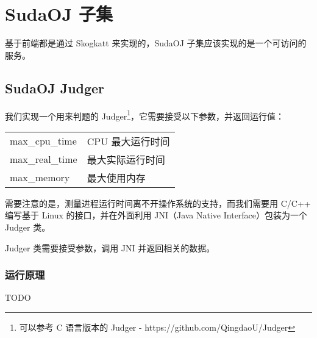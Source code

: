 
\section{SudaOJ 子集}
基于前端都是通过 Skogkatt 来实现的，SudaOJ 子集应该实现的是一个可访问的服务。

\subsection{SudaOJ Judger}
我们实现一个用来判题的 Judger\footnote{可以参考 C 语言版本的 Judger - %
https://github.com/QingdaoU/Judger}，它需要接受以下参数，并返回运行值：

\begin{center}
\begin{tabular}{ll}
    \hline
    max\_cpu\_time      & CPU 最大运行时间  \\
    max\_real\_time     & 最大实际运行时间  \\
    max\_memory         & 最大使用内存      \\
    \hline
\end{tabular}
\end{center}

需要注意的是，测量进程运行时间离不开操作系统的支持，而我们需要用 C/C++ 编写基于
Linux 的接口，并在外面利用 JNI（Java Native Interface）包装为一个 Judger 类。

Judger 类需要接受参数，调用 JNI 并返回相关的数据。

\subsubsection{运行原理}

TODO
